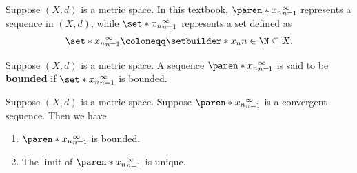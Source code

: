 \bigskip

\begin{remark}
  Suppose $(X, d)$ is a metric space. In this textbook, $\paren*{x_{n}}_{n = 1}^{\infty}$ represents
  a sequence in $(X, d)$, while $\set*{x_{n}}_{n = 1}^{\infty}$ represents a set defined as
  \[
    \set*{x_{n}}_{n = 1}^{\infty} \coloneqq \setbuilder*{x_{n}}{n \in \N} \subseteq X.
  \]
\end{remark}

\bigskip

\begin{definition} \label{an:def:bounded-sequence}
  Suppose $(X, d)$ is a metric space. A sequence $\paren*{x_{n}}_{n = 1}^{\infty}$
  is said to be \textbf{bounded} if $\set*{x_{n}}_{n = 1}^{\infty}$ is bounded.
\end{definition}

\bigskip

\begin{theorem} \label{an:thm:convergent-sequence-is-bounded}
  Suppose $(X, d)$ is a metric space. Suppose $\paren*{x_{n}}_{n = 1}^{\infty}$ is a convergent sequence. Then we have
  \begin{enumerate}[label=\textbf{(\Alph*)}]
    \item $\paren*{x_{n}}_{n = 1}^{\infty}$ is bounded.
    \item The limit of $\paren*{x_{n}}_{n = 1}^{\infty}$ is unique.
  \end{enumerate}
\end{theorem}

